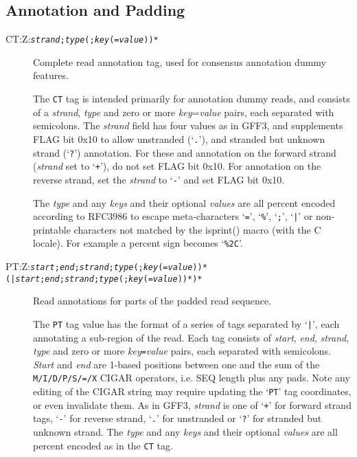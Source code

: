\documentclass[10pt]{article}
\newcommand{\tagregex}[1]{\tt #1}
\begin{document}
\subsection{Annotation and Padding}

\begin{description}
\item[CT:Z:\tagregex{\emph{strand};\emph{type}(;\emph{key}(=\emph{value}))*}]
Complete read annotation tag, used for consensus annotation dummy features.

The {\tt CT} tag is intended primarily for annotation
dummy reads, and consists of a \emph{strand}, \emph{type} and zero or
more \emph{key}=\emph{value} pairs, each separated with semicolons.
The \emph{strand} field has four values as in GFF3, and supplements FLAG
bit 0x10 to allow unstranded (`{\tt .}'), and stranded but unknown strand
(`{\tt ?}') annotation. For these and annotation on the forward strand
(\emph{strand} set to `{\tt +}'), do not set FLAG bit 0x10. For
annotation on the reverse strand, set the \emph{strand} to `{\tt -}'
and set FLAG bit 0x10.

The \emph{type} and any \emph{keys} and their
optional \emph{values} are all percent encoded according to
RFC3986 to escape meta-characters `{\tt =}', `{\tt \%}', `{\tt ;}',
`{\tt |}' or non-printable characters not matched by the isprint()
macro (with the C locale). For example a percent sign becomes
`{\tt \%2C}'.

\item[PT:Z:\tagregex{\tt \emph{start};\emph{end};\emph{strand};\emph{type}(;\emph{key}(=\emph{value}))*(\char92|\emph{start};\emph{end};\emph{strand};\emph{type}(;\emph{key}(=\emph{value}))*)*}]
Read annotations for parts of the padded read sequence.

The {\tt PT} tag value has the format of a series of
tags separated by `{\tt |}', each annotating a sub-region of the read.
Each tag consists of \emph{start}, \emph{end}, \emph{strand},
\emph{type} and zero or more \emph{key}{\tt =}\emph{value} pairs, each
separated with semicolons. \emph{Start} and \emph{end} are 1-based
positions between one and the sum of the {\tt M/I/D/P/S/=/X}
{\sf CIGAR} operators, i.e. {\sf SEQ} length plus any pads.  Note
any editing of the CIGAR string may require updating the `{\tt PT}'
tag coordinates, or even invalidate them.
As in GFF3, \emph{strand} is one of `{\tt +}' for forward strand tags,
`{\tt -}' for reverse strand, `{\tt .}' for unstranded or `{\tt ?}'
for stranded but unknown strand.
The \emph{type} and any \emph{keys} and their optional \emph{values}
are all percent encoded as in the {\tt CT} tag.
\end{description}
\end{document}
